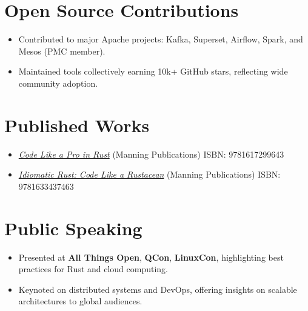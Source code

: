 \documentclass[margin,line]{resume}
\begin{document}
\begin{resume}
\section{Open Source Contributions}
\begin{itemize}[leftmargin=0.5cm]
    \item Contributed to major Apache projects: Kafka, Superset, Airflow, Spark, and Mesos (PMC member).
    \item Maintained tools collectively earning 10k+ GitHub stars, reflecting wide community adoption.
\end{itemize}

\vspace{10pt}

\section{Published Works}
\begin{itemize}[leftmargin=0.5cm]
    \item \href{https://www.manning.com/books/code-like-a-pro-in-rust}{\textit{Code Like a Pro in Rust}} (Manning Publications) \hfill ISBN: 9781617299643
    \item \href{https://www.manning.com/books/idiomatic-rust}{\textit{Idiomatic Rust: Code Like a Rustacean}} (Manning Publications) \hfill ISBN: 9781633437463
\end{itemize}

\vspace{10pt}

\section{Public Speaking}
\begin{itemize}[leftmargin=0.5cm]
    \item Presented at \textbf{All Things Open}, \textbf{QCon}, \textbf{LinuxCon}, highlighting best practices for Rust and cloud computing.
    \item Keynoted on distributed systems and DevOps, offering insights on scalable architectures to global audiences.
\end{itemize}

\end{resume}
\end{document}
